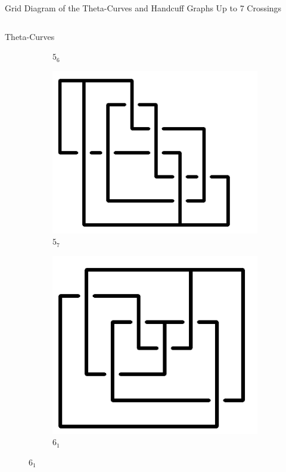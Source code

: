 \documentclass[final]{beamer}
\begin{document}
\begin{frame}[t]
\begin{alertblock}{Grid Diagram of the Theta-Curves and Handcuff Graphs Up to 7 Crossings}
\begin{columns}[t]
\begin{column}{0.5\textwidth}
\begin{alertblock}{Theta-Curves}
\begin{figure}
\begin{subfigure}{0.075\textwidth}
    \caption{$5_6$} 
    \end{subfigure}
    \begin{subfigure}{0.075\textwidth}
    \includegraphics[width=\columnwidth]{../Midterm_Poster/grid_diagram/theta_5_7.png}
    \caption{$5_7$} 
    \end{subfigure}
    \begin{subfigure}{0.075\textwidth}
    \includegraphics[width=\columnwidth]{../Midterm_Poster/grid_diagram/theta_6_1.png}
    \caption{$6_1$} 
    \end{subfigure}

\end{figure}
\end{alertblock}
\end{column}
\end{columns}
\end{alertblock}
\end{frame}
\end{document}
